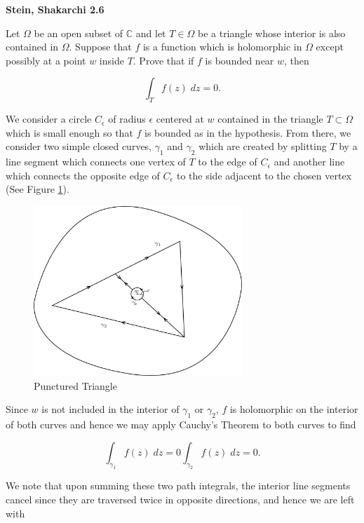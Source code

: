 \textbf{Stein, Shakarchi 2.6}

Let $\Omega$ be an open subset of $\mathbb{C}$ and let $T \in \Omega$ be a triangle whose interior is also contained in 
$\Omega$. Suppose that $f$ is a function which is holomorphic in $\Omega$ except possibly at a point $w$ inside $T$. 
Prove that if $f$ is bounded near $w$, then

$$
\int_T f(z) \; dz = 0.
$$

\begin{solution}
    We consider a circle $C_{\epsilon}$ of radius $\epsilon$ centered at $w$ contained in the triangle 
    $T \subset \Omega$ which is small enough so that $f$ is bounded as in the hypothesis. From there, we consider two 
    simple closed curves, $\gamma_1$ and $\gamma_2$ which are created by splitting $T$ by a line segment which connects 
    one vertex of $T$ to the edge of $C_{\epsilon}$ and another line which connects the opposite edge of $C_{\epsilon}$ 
    to the side adjacent to the chosen vertex (See Figure \ref{fig:problem_7}). 

    \begin{figure}[h]
        \centering
        \includegraphics*[width=0.7\textwidth]{problem_6.png}
        \caption{Punctured Triangle}
        \label{fig:problem_7}
    \end{figure}
    
    Since $w$ is not included in the interior of $\gamma_1$ or $\gamma_2$, $f$ is holomorphic on the interior of both 
    curves and hence we may apply Cauchy's Theorem to both curves to find

    $$
    \int_{\gamma_1} f(z) \; dz = 0 \int_{\gamma_2} f(z) \; dz = 0.
    $$

    We note that upon summing these two path integrals, the interior line segments cancel since they are traversed twice 
    in opposite directions, and hence we are left with


\end{solution}
